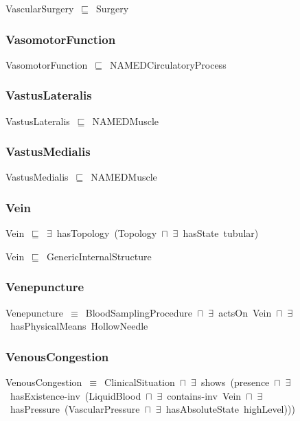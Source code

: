 \documentclass{article}
\begin{document}
VascularSurgery~\ensuremath{\sqsubseteq}~Surgery~

\subsubsection*{VasomotorFunction}

VasomotorFunction~\ensuremath{\sqsubseteq}~NAMEDCirculatoryProcess~

\subsubsection*{VastusLateralis}

VastusLateralis~\ensuremath{\sqsubseteq}~NAMEDMuscle~

\subsubsection*{VastusMedialis}

VastusMedialis~\ensuremath{\sqsubseteq}~NAMEDMuscle~

\subsubsection*{Vein}

Vein~\ensuremath{\sqsubseteq}~\ensuremath{\exists}~hasTopology~(Topology~\ensuremath{\sqcap}~\ensuremath{\exists}~hasState~tubular)~

Vein~\ensuremath{\sqsubseteq}~GenericInternalStructure~

\subsubsection*{Venepuncture}

Venepuncture~\ensuremath{\equiv}~BloodSamplingProcedure~\ensuremath{\sqcap}~\ensuremath{\exists}~actsOn~Vein~\ensuremath{\sqcap}~\ensuremath{\exists}~hasPhysicalMeans~HollowNeedle

\subsubsection*{VenousCongestion}

VenousCongestion~\ensuremath{\equiv}~ClinicalSituation~\ensuremath{\sqcap}~\ensuremath{\exists}~shows~(presence~\ensuremath{\sqcap}~\ensuremath{\exists}~hasExistence-inv~(LiquidBlood~\ensuremath{\sqcap}~\ensuremath{\exists}~contains-inv~Vein~\ensuremath{\sqcap}~\ensuremath{\exists}~hasPressure~(VascularPressure~\ensuremath{\sqcap}~\ensuremath{\exists}~hasAbsoluteState~highLevel)))
\end{document}
